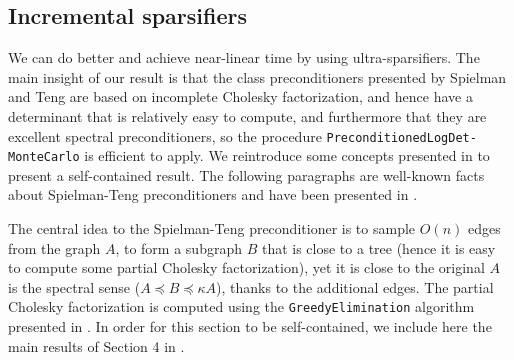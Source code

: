

\subsection{Incremental sparsifiers\label{sec:Incremental-sparsifiers}}

We can do better and achieve near-linear time by using ultra-sparsifiers.
The main insight of our result is that the class preconditioners presented
by Spielman and Teng are based on incomplete Cholesky factorization,
and hence have a determinant that is relatively easy to compute, and
furthermore that they are excellent spectral preconditioners, so the
procedure \texttt{PreconditionedLogDet-MonteCarlo} is efficient to
apply. We reintroduce some concepts presented in \cite{Koutis2010}
to present a self-contained result. The following paragraphs are well-known
facts about Spielman-Teng preconditioners and have been presented
in \cite{Koutis2010,Spielman2009a}.

The central idea to the Spielman-Teng preconditioner is to sample
$O\left(n\right)$ edges from the graph $A$, to form a subgraph $B$
that is close to a tree (hence it is easy to compute some partial
Cholesky factorization), yet it is close to the original $A$ is the
spectral sense ($A\preceq B\preceq\kappa A$), thanks to the additional
edges. The partial Cholesky factorization is computed using the \texttt{GreedyElimination}
algorithm presented in \cite{Koutis2010}. In order for this section
to be self-contained, we include here the main results of Section
4 in \cite{Spielman2009a}.

